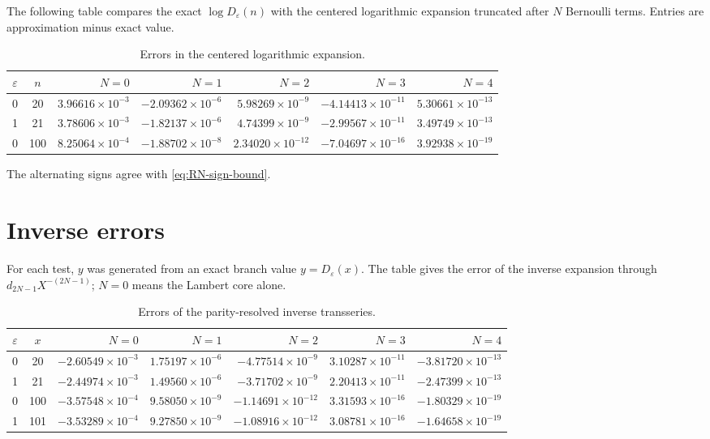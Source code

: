 \documentclass[11pt,a4paper,oneside]{book}
\newcommand{\eps}{\varepsilon}
\begin{document}
The following table compares the exact
\(\log D_\eps(n)\) with the centered logarithmic expansion truncated after
\(N\) Bernoulli terms.  Entries are approximation minus exact value.

\begin{table}[ht]
\centering
\small
\setlength{\tabcolsep}{3pt}
\caption{Errors in the centered logarithmic expansion.}
\label{tab:forward-errors}
\begin{tabular}{c c r r r r r}
\toprule
\(\eps\)&\(n\)&\(N=0\)&\(N=1\)&\(N=2\)&\(N=3\)&\(N=4\)\\
\midrule
0&20&
 \(3.96616{\times}10^{-3}\)&
 \(-2.09362{\times}10^{-6}\)&
 \(5.98269{\times}10^{-9}\)&
 \(-4.14413{\times}10^{-11}\)&
 \(5.30661{\times}10^{-13}\)\\
1&21&
 \(3.78606{\times}10^{-3}\)&
 \(-1.82137{\times}10^{-6}\)&
 \(4.74399{\times}10^{-9}\)&
 \(-2.99567{\times}10^{-11}\)&
 \(3.49749{\times}10^{-13}\)\\
0&100&
 \(8.25064{\times}10^{-4}\)&
 \(-1.88702{\times}10^{-8}\)&
 \(2.34020{\times}10^{-12}\)&
 \(-7.04697{\times}10^{-16}\)&
 \(3.92938{\times}10^{-19}\)\\
\bottomrule
\end{tabular}
\end{table}

The alternating signs agree with \cref{eq:RN-sign-bound}.

\section{Inverse errors}

For each test, \(y\) was generated from an exact branch value
\(y=D_\eps(x)\).  The table gives the error of the inverse expansion through
\(d_{2N-1}X^{-(2N-1)}\); \(N=0\) means the Lambert core alone.

\begin{table}[ht]
\centering
\small
\setlength{\tabcolsep}{3pt}
\caption{Errors of the parity-resolved inverse transseries.}
\label{tab:inverse-errors}
\begin{tabular}{c c r r r r r}
\toprule
\(\eps\)&\(x\)&\(N=0\)&\(N=1\)&\(N=2\)&\(N=3\)&\(N=4\)\\
\midrule
0&20&
 \(-2.60549{\times}10^{-3}\)&
 \(1.75197{\times}10^{-6}\)&
 \(-4.77514{\times}10^{-9}\)&
 \(3.10287{\times}10^{-11}\)&
 \(-3.81720{\times}10^{-13}\)\\
1&21&
 \(-2.44974{\times}10^{-3}\)&
 \(1.49560{\times}10^{-6}\)&
 \(-3.71702{\times}10^{-9}\)&
 \(2.20413{\times}10^{-11}\)&
 \(-2.47399{\times}10^{-13}\)\\
0&100&
 \(-3.57548{\times}10^{-4}\)&
 \(9.58050{\times}10^{-9}\)&
 \(-1.14691{\times}10^{-12}\)&
 \(3.31593{\times}10^{-16}\)&
 \(-1.80329{\times}10^{-19}\)\\
1&101&
 \(-3.53289{\times}10^{-4}\)&
 \(9.27850{\times}10^{-9}\)&
 \(-1.08916{\times}10^{-12}\)&
 \(3.08781{\times}10^{-16}\)&
 \(-1.64658{\times}10^{-19}\)\\
\bottomrule
\end{tabular}
\end{table}
\end{document}
